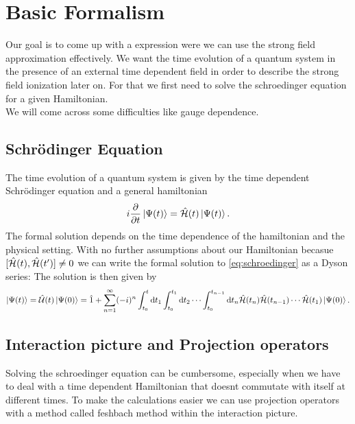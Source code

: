 \newpage
\section{Basic Formalism}
Our goal is to come up with a expression were we can use the strong field approximation effectively.
We want the time evolution of a quantum system in the presence of an external time dependent field in order to describe the strong field ionization later on.
For that we first need to solve the schroedinger equation for a given Hamiltonian.\\
We will come across some difficulties like gauge dependence.

\subsection{Schrödinger Equation}
The time evolution of a quantum system is given by the time dependent Schrödinger equation and a general hamiltonian
\begin{equation}
    i \frac{\partial}{\partial t} \ket{\Psi(t)} = \hat{\mathcal{H}}(t) \ket{\Psi(t)}. \label{eq:schroedinger}
\end{equation}
The formal solution depends on the time dependence of the hamiltonian and the physical setting. 
With no further assumptions about our Hamiltonian becasue $[\hat{\mathcal{H}}(t), \hat{\mathcal{H}}(t')] \neq 0$ we can write the formal solution to \eqref{eq:schroedinger} as a Dyson series:
The solution is then given by 
\begin{equation}
    \ket{\Psi(t)} = \hat{\mathcal{U}}(t)\ket{\Psi(0)} = \hat{1} + \sum_{n=1}^{\infty} (-i)^n \int_{t_0}^{t} \mathrm{d} t_1 \int_{t_0}^{t_1} \mathrm{d} t_2 \cdots \int_{t_0}^{t_{n-1}} \mathrm{d} t_n \hat{\mathcal{H}}(t_n) \hat{\mathcal{H}}(t_{n-1})\cdots\hat{\mathcal{H}}(t_1) \ket{\Psi(0)}. \label{eq:dyson}
\end{equation}
\subsection{Interaction picture and Projection operators}
Solving the schroedinger equation can be cumbersome, especially when we have to deal with a time dependent Hamiltonian that doesnt commutate with itself at different times.
To make the calculations easier we can use projection operators with a method called feshbach method within the interaction picture.




